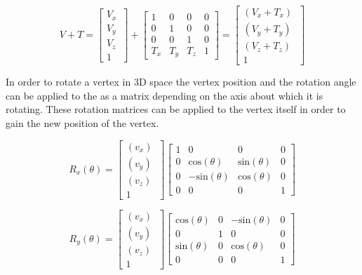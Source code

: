 \begin{equation}
V + T = \begin{bmatrix}
V_{x} \\
V_{y} \\
V_{z}~ \\
1
\end{bmatrix}
+
\begin{bmatrix}
1 & 0 & 0 & 0\\
0 & 1 & 0 & 0\\
0 & 0 & 1 & 0\\
T_{x} & T_{y} & T_{z} & 1
\end{bmatrix}
= \begin{bmatrix}
(V_x + T_x)~ \\
(V_y + T_y)~ \\
(V_z + T_z)~ \\
1
\end{bmatrix}
\end{equation}

\noindent

In order to rotate a vertex in 3D space the vertex position and the rotation angle can be applied to the as a matrix depending on the axis about which it is rotating. These rotation matrices can be applied to the vertex itself in order to gain the new position of the vertex. 

\begin{equation}
R_x(\theta) = 
\begin{bmatrix}
(v_x)~ \\
(v_y)~ \\ 
(v_z)~ \\
1
\end{bmatrix}
\begin{bmatrix}
1 	& 0 					& 0 					& 0\\
0 	& \text{cos}(\theta) 	& \text{sin}(\theta) 	& 0\\
0 	& -\text{sin}(\theta) 	& \text{cos}(\theta) 	& 0\\
0 	& 0 					& 0 					& 1
\end{bmatrix}
\end{equation}

\begin{equation}
R_y(\theta) = 
\begin{bmatrix}
(v_x)~ \\
(v_y)~ \\
(v_z)~ \\
1
\end{bmatrix}
\begin{bmatrix}
\text{cos}(\theta) 	& 0 					& -\text{sin}(\theta) 	& 0\\
0 					& 1						& 0						& 0\\
\text{sin}(\theta) 	& 0 					& \text{cos}(\theta)	& 0\\
0 					& 0 					& 0 					& 1
\end{bmatrix}
\end{equation}

